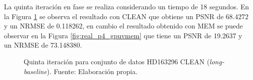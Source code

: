 La quinta iteración en fase se realiza considerando un tiempo de 18 segundos. En la Figura \ref{fig:real_p4_clean} se observa el resultado con CLEAN que obtiene un PSNR de 68.4272 y un NRMSE de 0.118262, en cambio el resultado obtenido con MEM se puede observar en la Figura \ref{fig:real_p4_gpuvmem} que tiene un PSNR de 19.2637 y un NRMSE de 73.148380.

\begin{figure}[!ht]
 \centering
    \vspace{0.3cm}
 \caption[Quinta iteración para conjunto de datos HD163296 CLEAN (\textit{long-baseline})]{Quinta iteración para conjunto de datos HD163296 CLEAN (\textit{long-baseline}). Fuente: Elaboración propia.}
 \label{fig:real_p4_clean}
\end{figure}

